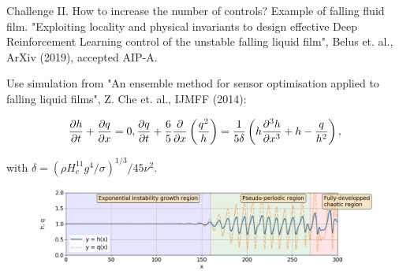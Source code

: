 \documentclass{beamer}
\begin{document}
{

}

{

}

{

}



\begin{frame}{Challenge II. How to increase the number of controls? Example of falling fluid film.}
  "Exploiting locality and physical invariants to design effective Deep Reinforcement Learning control of the unstable falling liquid film", Belus et. al., ArXiv (2019), accepted AIP-A.
  
  Use simulation from "An ensemble method for sensor optimisation applied to falling liquid films", Z. Che et. al., IJMFF (2014):
  
  \begin{equation*}
    \frac{\partial h}{\partial t} + \frac{\partial q}{\partial x} = 0, \newline
    \frac{\partial q}{\partial t} + \frac{6}{5} \frac{\partial}{\partial x} \left( \frac{q^ 2}{h} \right) = \frac{1}{5 \delta} \left( h \frac{\partial^3 h}{\partial x^3} + h - \frac{q}{h^2} \right),
\end{equation*}

with $\delta = (\rho H_c^{11}g^4/ \sigma)^{1/3} /45 \nu^2$.

    \begin{figure}
    \begin{center}
      \includegraphics[width=.92\textwidth]{Figures/regions_}
    \end{center}
    \end{figure}
\end{frame}
\end{document}
